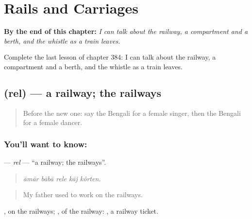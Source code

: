 
\chapter{Rails and Carriages}
\label{ch:bn-rails-and-carriages}

\begin{chapteropening}
\textbf{By the end of this chapter:} \emph{I can talk about the railway, a compartment and a berth, and the whistle as a train leaves.}

Complete the last lesson of chapter 384: I can talk about the railway, a compartment and a berth, and the whistle as a train leaves.
\end{chapteropening}

\section[\texorpdfstring{\bn{রেল} (rel)}{রেল (rel)}]{ (rel) — a railway; the railways}

\label{lesson:BN-C384-rel}



\begin{quote}
Before the new one: say the Bengali for a female singer, then the Bengali for a female dancer.
\end{quote}

\subsection*{You'll want to know: }
\textbf{} — \emph{rel} — \textquotedblleft{}a railway; the railways\textquotedblright{}.

\begin{quote}
    
\end{quote}

\begin{quote}
\emph{āmār bābā rele kāj kôrten.}
\end{quote}

\begin{quote}
My father used to work on the railways.
\end{quote}

, on the railways; , of the railway:  , a railway ticket.

